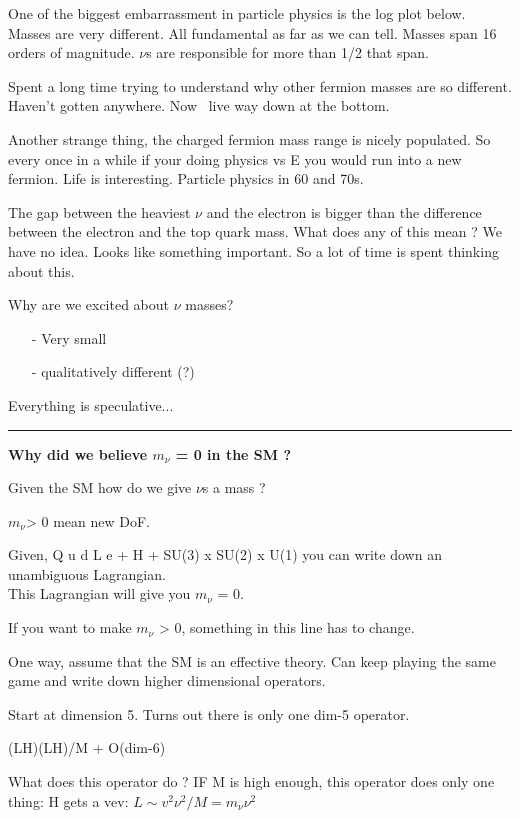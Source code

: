 {One of the biggest embarrassment in particle physics is the log plot below.
Masses are very different. 
All fundamental as far as we can tell. 
Masses span 16 orders of magnitude. 
$\nu$s are responsible for more than 1/2 that span. 

Spent a long time trying to understand why other fermion masses are so different. 
Haven't gotten anywhere. 
Now \nus\ live way down at the bottom.

Another strange thing, the charged fermion mass range is nicely populated. 
So every once in a while if your doing physics vs E you would run into a new fermion. 
Life is interesting. 
Particle physics in 60 and 70s. 

The gap between the heaviest $\nu$ and the electron is bigger than the difference between the electron and the top quark mass. 
What does any of this mean ? 
We have no idea.
Looks like something important.
So a lot of time is spent thinking about this.

Why are we excited about $\nu$ masses? 
\begin{itemize}
\item[-] Very small
\item[-] qualitatively different (?)
\end{itemize}

Everything is speculative...


\noindent\rule{\textwidth}{1pt}

\textbf{Why did we believe $m_\nu$ = 0 in the SM ?}

Given the SM how do we give $\nu$s a mass ?

$m_\nu$> 0 mean new DoF.

Given, 
\bc
Q u d L e  + H + SU(3) x SU(2) x U(1)
\ec
you can write down an unambiguous Lagrangian.\\
This Lagrangian will give you $m_\nu$ = 0.

If you want to make $m_\nu$ > 0, something in this line has to change. 

One way, assume that the SM is an effective theory. 
Can keep playing the same game and write down higher dimensional operators. 

Start at dimension 5. 
Turns out there is only one dim-5 operator. 

(LH)(LH)/M + O(dim-6) 

What does this operator do ?
IF M is high enough, this operator does only one thing:
\bc
H gets a vev:   $L \sim  v^2 \nu^2 / M   = m_\nu  \nu^2$
\ec

}
